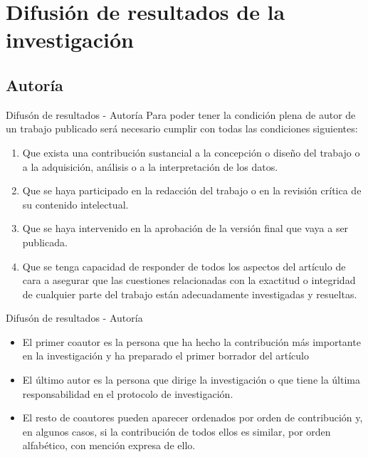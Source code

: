 \section{Difusión de resultados de la investigación}
\subsection{Autoría}
\begin{frame}{Difusón de resultados - Autoría}
    Para poder tener la condición plena de autor de un trabajo publicado será necesario cumplir con todas las condiciones siguientes:
\begin{enumerate}
    \item Que exista una contribución sustancial a la concepción o diseño del trabajo o a la adquisición,
    análisis o a la interpretación de los datos.
    \item Que se haya participado en la redacción del trabajo o en la revisión crítica de su contenido
    intelectual.
    \item Que se haya intervenido en la aprobación de la versión final que vaya a ser publicada.
    \item Que se tenga capacidad de responder de todos los aspectos del artículo de cara a asegurar
    que las cuestiones relacionadas con la exactitud o integridad de cualquier parte del trabajo
    están adecuadamente investigadas y resueltas.
\end{enumerate}
\end{frame}
\begin{frame}{Difusón de resultados - Autoría}
    \begin{itemize}
        \item El primer coautor es la persona que ha hecho la contribución más importante en la
        investigación y ha preparado el primer borrador del artículo
        \item El último autor es la persona que dirige la investigación o que tiene la última
        responsabilidad en el protocolo de investigación.
        \item El resto de coautores pueden aparecer ordenados por orden de contribución y, en
        algunos casos, si la contribución de todos ellos es similar, por orden alfabético, con
        mención expresa de ello.
    \end{itemize}
\end{frame}
